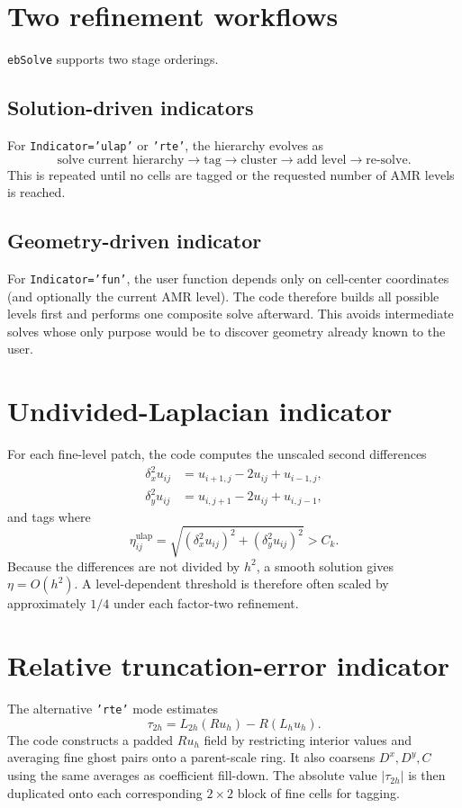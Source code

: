 \documentclass[11pt,oneside,openany]{book}
\newcommand{\code}[1]{\textnormal{\texttt{#1}}}
\begin{document}
\section{Two refinement workflows}
\code{ebSolve} supports two stage orderings.

\subsection{Solution-driven indicators}
For \code{Indicator='ulap'} or \code{'rte'}, the hierarchy evolves as
\[
  \text{solve current hierarchy}
  \longrightarrow \text{tag}
  \longrightarrow \text{cluster}
  \longrightarrow \text{add level}
  \longrightarrow \text{re-solve}.
\]
This is repeated until no cells are tagged or the requested number of AMR levels is reached.

\subsection{Geometry-driven indicator}
For \code{Indicator='fun'}, the user function depends only on cell-center coordinates (and optionally the current AMR level). The code therefore builds all possible levels first and performs one composite solve afterward. This avoids intermediate solves whose only purpose would be to discover geometry already known to the user.

\section{Undivided-Laplacian indicator}
For each fine-level patch, the code computes the unscaled second differences
\begin{align*}
 \delta_x^2u_{ij}&=u_{i+1,j}-2u_{ij}+u_{i-1,j},\\
 \delta_y^2u_{ij}&=u_{i,j+1}-2u_{ij}+u_{i,j-1},
\end{align*}
and tags where
\begin{equation}
  \eta_{ij}^{\mathrm{ulap}}
  =\sqrt{(\delta_x^2u_{ij})^2+(\delta_y^2u_{ij})^2}
  >C_k.
  \label{eq:ulap}
\end{equation}
Because the differences are not divided by $h^2$, a smooth solution gives $\eta=O(h^2)$. A level-dependent threshold is therefore often scaled by approximately $1/4$ under each factor-two refinement.

\section{Relative truncation-error indicator}
The alternative \code{'rte'} mode estimates
\begin{equation}
  \tau_{2h}=L_{2h}(Ru_h)-R(L_hu_h).
  \label{eq:rte}
\end{equation}
The code constructs a padded $Ru_h$ field by restricting interior values and averaging fine ghost pairs onto a parent-scale ring. It also coarsens $D^x,D^y,C$ using the same averages as coefficient fill-down. The absolute value $|\tau_{2h}|$ is then duplicated onto each corresponding $2\times2$ block of fine cells for tagging.
\end{document}
